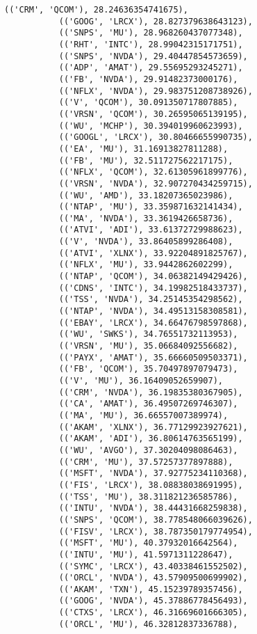 \documentclass[11pt]{article}
\begin{document}
\begin{Verbatim}[commandchars=\\\{\}]
           (('CRM', 'QCOM'), 28.24636354741675),
           (('GOOG', 'LRCX'), 28.827379638643123),
           (('SNPS', 'MU'), 28.968260437077348),
           (('RHT', 'INTC'), 28.99042315171751),
           (('SNPS', 'NVDA'), 29.40447854573659),
           (('ADP', 'AMAT'), 29.55695293245271),
           (('FB', 'NVDA'), 29.91482373000176),
           (('NFLX', 'NVDA'), 29.983751208738926),
           (('V', 'QCOM'), 30.091350717807885),
           (('VRSN', 'QCOM'), 30.26595065139195),
           (('WU', 'MCHP'), 30.394019960623993),
           (('GOOGL', 'LRCX'), 30.80466655990735),
           (('EA', 'MU'), 31.16913827811288),
           (('FB', 'MU'), 32.511727562217175),
           (('NFLX', 'QCOM'), 32.61305961899776),
           (('VRSN', 'NVDA'), 32.907270434259715),
           (('WU', 'AMD'), 33.18207365023986),
           (('NTAP', 'MU'), 33.359871632141434),
           (('MA', 'NVDA'), 33.3619426658736),
           (('ATVI', 'ADI'), 33.61372729988623),
           (('V', 'NVDA'), 33.86405899286408),
           (('ATVI', 'XLNX'), 33.92204891825767),
           (('NFLX', 'MU'), 33.9442862602299),
           (('NTAP', 'QCOM'), 34.06382149429426),
           (('CDNS', 'INTC'), 34.19982518433737),
           (('TSS', 'NVDA'), 34.25145354298562),
           (('NTAP', 'NVDA'), 34.49513158308581),
           (('EBAY', 'LRCX'), 34.66476798597868),
           (('WU', 'SWKS'), 34.76551732113953),
           (('VRSN', 'MU'), 35.06684092556682),
           (('PAYX', 'AMAT'), 35.66660509503371),
           (('FB', 'QCOM'), 35.70497897079473),
           (('V', 'MU'), 36.16409052659907),
           (('CRM', 'NVDA'), 36.19835380367905),
           (('CA', 'AMAT'), 36.49507269746307),
           (('MA', 'MU'), 36.66557007389974),
           (('AKAM', 'XLNX'), 36.77129923927621),
           (('AKAM', 'ADI'), 36.80614763565199),
           (('WU', 'AVGO'), 37.30204098086463),
           (('CRM', 'MU'), 37.57257377897888),
           (('MSFT', 'NVDA'), 37.92775234110368),
           (('FIS', 'LRCX'), 38.08838038691995),
           (('TSS', 'MU'), 38.311821236585786),
           (('INTU', 'NVDA'), 38.44431668259838),
           (('SNPS', 'QCOM'), 38.778548066039626),
           (('FISV', 'LRCX'), 38.787350179774954),
           (('MSFT', 'MU'), 40.37932016642564),
           (('INTU', 'MU'), 41.5971311228647),
           (('SYMC', 'LRCX'), 43.40338461552502),
           (('ORCL', 'NVDA'), 43.57909500699902),
           (('AKAM', 'TXN'), 45.15239789357456),
           (('GOOG', 'NVDA'), 45.37886778456493),
           (('CTXS', 'LRCX'), 46.31669601666305),
           (('ORCL', 'MU'), 46.32812837336788),

\end{Verbatim}
\end{document}
